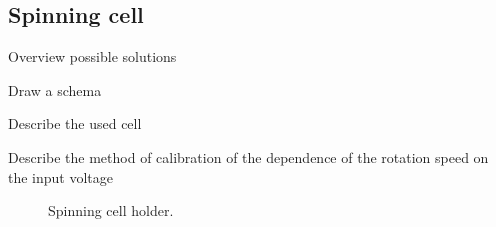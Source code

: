 \subsection{Spinning cell}
\begin{docitemize}
	\item Overview possible solutions
	\item Draw a schema
	\item Describe the used cell
	\item Describe the method of calibration of the dependence of the rotation
	speed on the input voltage
\end{docitemize}

\begin{figure}
	\centering
	
	\caption{Spinning cell holder.}
	\label{\figlabel{spinning_cell:drawing}}
\end{figure}
